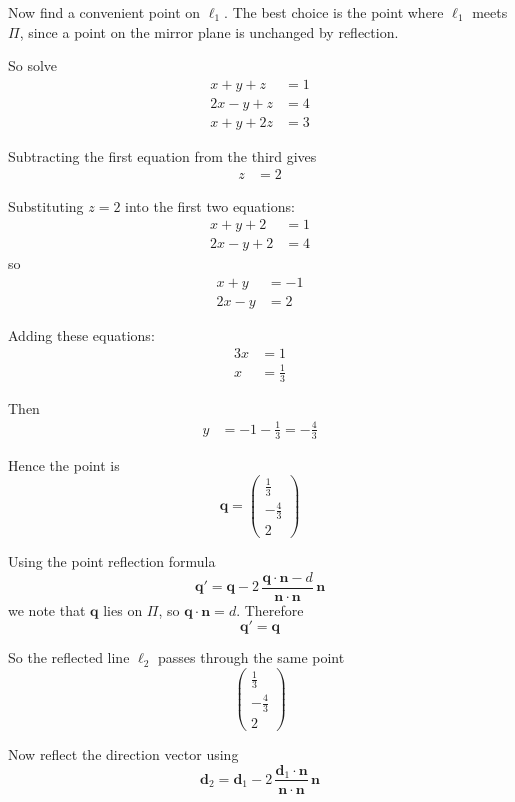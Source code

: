 \documentclass[leqno]{article}
\begin{document}
\begin{enumerate}[
  label=\textbf{\arabic*.},
  leftmargin=*,
  topsep=0pt,
  partopsep=0pt,
  parsep=0pt
]
\begin{tcolorbox}[colback=white, colframe=scarlet, title={\textbf{Solution}}, breakable, grow to left by=6mm, grow to right by=10mm]
Now find a convenient point on \(\ell_1\). The best choice is the point where \(\ell_1\) meets \(\Pi\), since a point on the mirror plane is unchanged by reflection.

So solve
\begin{align*}
x+y+z&=1\\
2x-y+z&=4\\
x+y+2z&=3
\end{align*}

Subtracting the first equation from the third gives
\begin{align*}
z&=2
\end{align*}

Substituting \(z=2\) into the first two equations:
\begin{align*}
x+y+2&=1\\
2x-y+2&=4
\end{align*}
so
\begin{align*}
x+y&=-1\\
2x-y&=2
\end{align*}

Adding these equations:
\begin{align*}
3x&=1\\
x&=\frac13
\end{align*}

Then
\begin{align*}
y&=-1-\frac13=-\frac43
\end{align*}

Hence the point is
\[
\mathbf q=\begin{pmatrix}\frac13\\-\frac43\\2\end{pmatrix}
\]

Using the point reflection formula
\[
\mathbf q'
=
\mathbf q
-2\,\frac{\mathbf q\cdot\mathbf n-d}{\mathbf n\cdot\mathbf n}\,\mathbf n
\]
we note that \(\mathbf q\) lies on \(\Pi\), so \(\mathbf q\cdot \mathbf n=d\). Therefore
\[
\mathbf q'=\mathbf q
\]

So the reflected line \(\ell_2\) passes through the same point
\[
\begin{pmatrix}\frac13\\-\frac43\\2\end{pmatrix}
\]

Now reflect the direction vector using
\[
\mathbf d_2
=
\mathbf d_1
-2\,\frac{\mathbf d_1\cdot\mathbf n}{\mathbf n\cdot\mathbf n}\,\mathbf n
\]


\end{tcolorbox}
\end{enumerate}
\end{document}
